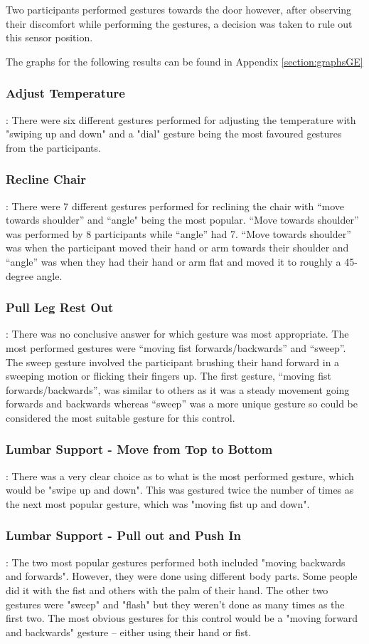 \documentclass{l4proj}
\begin{document}
Two participants performed gestures towards the door however, after observing their discomfort while performing the gestures, a decision was taken to rule out this sensor position. 

The graphs for the following results can be found in Appendix \ref{section:graphsGE}

\subsubsection{Adjust Temperature}: There were six different gestures performed for adjusting the temperature with "swiping up and down" and a "dial" gesture being the most favoured gestures from the participants.
\subsubsection{Recline Chair}: There were 7 different gestures performed for reclining the chair with “move towards shoulder” and “angle" being the most popular. “Move towards shoulder” was performed by 8 participants while “angle” had 7. “Move towards shoulder” was when the participant moved their hand or arm towards their shoulder and “angle” was when they had their hand or arm flat and moved it to roughly a 45-degree angle.
\subsubsection{Pull Leg Rest Out}: There was no conclusive answer for which gesture was most appropriate. The most performed gestures were “moving fist forwards/backwards” and “sweep”. The sweep gesture involved the participant brushing their hand forward in a sweeping motion or flicking their fingers up. The first gesture, “moving fist forwards/backwards”, was similar to others as it was a steady movement going forwards and backwards whereas “sweep” was a more unique gesture so could be considered the most suitable gesture for this control.
\subsubsection{Lumbar Support - Move from Top to Bottom}: There was a very clear choice as to what is the most performed gesture, which would be "swipe up and down". This was gestured twice the number of times as the next most popular gesture, which was "moving fist up and down". 
\subsubsection{Lumbar Support - Pull out and Push In}: The two most popular gestures performed both included "moving backwards and forwards". However, they were done using different body parts. Some people did it with the fist and others with the palm of their hand. The other two gestures were "sweep" and "flash" but they weren’t done as many times as the first two. The most obvious gestures for this control would be a "moving forward and backwards" gesture – either using their hand or fist. 
\end{document}
